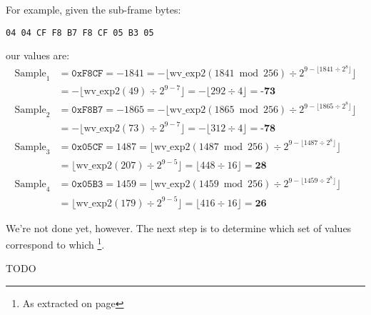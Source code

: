 \par
\noindent
For example, given the sub-frame bytes:
\begin{Verbatim}[frame=single]
04 04 CF F8 B7 F8 CF 05 B3 05
\end{Verbatim}
our  values are:
\begin{align*}
\text{Sample}_1 &= \texttt{0xF8CF} = -1841
 = -\lfloor \text{wv\_exp2}(1841 \bmod{256}) \div 2 ^ {9 - \lfloor 1841 \div 2 ^ 8 \rfloor} \rfloor \\
&= -\lfloor \text{wv\_exp2}(49) \div 2 ^ {9 - 7} \rfloor
 = -\lfloor 292 \div 4 \rfloor = \textbf{-73} \\
\text{Sample}_2 &= \texttt{0xF8B7} = -1865
 = -\lfloor \text{wv\_exp2}(1865 \bmod{256}) \div 2 ^ {9 - \lfloor 1865 \div 2 ^ 8 \rfloor} \rfloor \\
&= -\lfloor \text{wv\_exp2}(73) \div 2 ^ {9 - 7} \rfloor
 =  -\lfloor 312 \div 4 \rfloor = \textbf{-78} \\
\text{Sample}_3 &= \texttt{0x05CF} = 1487
 = \lfloor \text{wv\_exp2}(1487 \bmod{256}) \div 2 ^ {9 - \lfloor 1487 \div 2 ^ 8 \rfloor} \rfloor \\
&= \lfloor \text{wv\_exp2}(207) \div 2 ^ {9 - 5} \rfloor
 = \lfloor 448 \div 16 \rfloor = \textbf{28} \\
\text{Sample}_4 &= \texttt{0x05B3} = 1459
 = \lfloor \text{wv\_exp2}(1459 \bmod{256}) \div 2 ^ {9 - \lfloor 1459 \div 2 ^ 8 \rfloor} \rfloor \\
&= \lfloor \text{wv\_exp2}(179) \div 2 ^ {9 - 5} \rfloor
 = \lfloor 416 \div 16 \rfloor = \textbf{26}
\end{align*}

\clearpage

We're not done yet, however.
The next step is to determine which set of 
values correspond to which \footnote{As
extracted on page \pageref{wavpack_decorr_terms}}.

TODO


\clearpage

